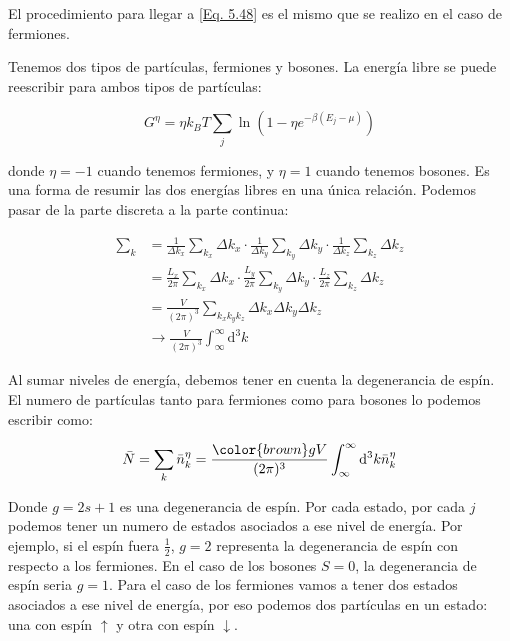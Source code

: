 \documentclass[11pt,fleqn]{book}
\begin{document}
\begin{exercise}

El procedimiento para llegar a \ref{Eq. 5.48} es el mismo que se realizo en el caso de fermiones.
\end{exercise}

Tenemos dos tipos de partículas, fermiones y bosones. La energía libre se puede reescribir para ambos tipos de partículas:

\begin{equation}
    G^{\eta}=\eta k_{B}T\sum_{j}\ln{\left(1-\eta e^{-\beta(E_{j}-\mu)}\right)}
\end{equation}              

donde $\eta=-1$ cuando tenemos fermiones, y $\eta=1$ cuando tenemos bosones. Es una forma de resumir las dos energías libres en una única relación. Podemos pasar de la parte discreta a la parte continua:

\begin{equation}
    \begin{split}
        \sum_{k}&=\frac{1}{\Delta k_{x}}\sum_{k_{x}}\Delta k_{x}\cdot\frac{1}{\Delta k_{y}}\sum_{k_{y}}\Delta k_{y}\cdot\frac{1}{\Delta k_{z}}\sum_{k_{z}}\Delta k_{z}\\
        &=\frac{L_{x}}{2\pi}\sum_{k_{x}}\Delta k_{x}\cdot\frac{L_{y}}{2\pi}\sum_{k_{y}}\Delta k_{y}\cdot\frac{L_{z}}{2\pi}\sum_{k_{z}}\Delta k_{z}\\
        &=\frac{V}{(2\pi)^{3}}\sum_{k_{x}k_{y}k_{z}}\Delta k_{x}\Delta k_{y}\Delta k_{z}\\
        &\longrightarrow\frac{V}{(2\pi)^{3}}\int_{\infty}^{{\infty}}\mathrm{d}^{3}k
    \end{split}
\end{equation}  

Al sumar niveles de energía, debemos tener en cuenta la degenerancia de espín. El numero de partículas tanto para fermiones como para bosones lo podemos escribir como:

\begin{equation}
    \bar{N}=\sum_{k}\bar{n}_{k}^{\eta}=\frac{{\color{brown}g}V}{(2\pi)^{3}}\int_{\infty}^{{\infty}}\mathrm{d}^{3}k\bar{n}_{k}^{\eta}
    \label{Eq. 5.50}
\end{equation}

Donde $g=2s+1$ es una degenerancia de espín. Por cada estado, por cada $j$ podemos tener un numero de estados asociados a ese nivel de energía. Por ejemplo, si el espín fuera $\frac{1}{2}$, $g=2$ representa la degenerancia de espín con respecto a los fermiones. En el caso de los bosones $S=0$, la degenerancia de espín seria $g=1$. Para el caso de los fermiones vamos a tener dos estados asociados a ese nivel de energía, por eso podemos dos partículas en un estado: una con espín $\uparrow$ y otra con espín $\downarrow$. 
\end{document}

